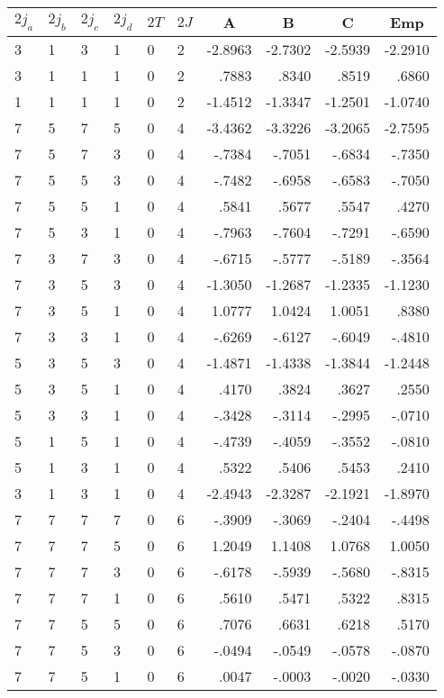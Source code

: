 \clearpage
\small
\begin{center}
\begin{tabular}{llllllrrrr}
\hline
$2j_{a}$&$2j_{b}$&$2j_{c}$&$2j_{d}$&$2T$&$2J$&
\multicolumn{1}{c}{A}&
\multicolumn{1}{c}{B}&
\multicolumn{1}{c}{C}&
\multicolumn{1}{c}{Emp}
\\\hline
  3& 1& 3& 1& 0& 2& -2.8963& -2.7302& -2.5939& -2.2910\\
  3& 1& 1& 1& 0& 2&   .7883&   .8340&   .8519&   .6860\\
  1& 1& 1& 1& 0& 2& -1.4512& -1.3347& -1.2501& -1.0740\\
  7& 5& 7& 5& 0& 4& -3.4362& -3.3226& -3.2065& -2.7595\\
  7& 5& 7& 3& 0& 4&  -.7384&  -.7051&  -.6834&  -.7350\\
  7& 5& 5& 3& 0& 4&  -.7482&  -.6958&  -.6583&  -.7050\\
  7& 5& 5& 1& 0& 4&   .5841&   .5677&   .5547&   .4270\\
  7& 5& 3& 1& 0& 4&  -.7963&  -.7604&  -.7291&  -.6590\\
  7& 3& 7& 3& 0& 4&  -.6715&  -.5777&  -.5189&  -.3564\\
  7& 3& 5& 3& 0& 4& -1.3050& -1.2687& -1.2335& -1.1230\\
  7& 3& 5& 1& 0& 4&  1.0777&  1.0424&  1.0051&   .8380\\
  7& 3& 3& 1& 0& 4&  -.6269&  -.6127&  -.6049&  -.4810\\
  5& 3& 5& 3& 0& 4& -1.4871& -1.4338& -1.3844& -1.2448\\
  5& 3& 5& 1& 0& 4&   .4170&   .3824&   .3627&   .2550\\
  5& 3& 3& 1& 0& 4&  -.3428&  -.3114&  -.2995&  -.0710\\
  5& 1& 5& 1& 0& 4&  -.4739&  -.4059&  -.3552&  -.0810\\
  5& 1& 3& 1& 0& 4&   .5322&   .5406&   .5453&   .2410\\
  3& 1& 3& 1& 0& 4& -2.4943& -2.3287& -2.1921& -1.8970\\
  7& 7& 7& 7& 0& 6&  -.3909&  -.3069&  -.2404&  -.4498\\
  7& 7& 7& 5& 0& 6&  1.2049&  1.1408&  1.0768&  1.0050\\
  7& 7& 7& 3& 0& 6&  -.6178&  -.5939&  -.5680&  -.8315\\
  7& 7& 7& 1& 0& 6&   .5610&   .5471&   .5322&   .8315\\
  7& 7& 5& 5& 0& 6&   .7076&   .6631&   .6218&   .5170\\
  7& 7& 5& 3& 0& 6&  -.0494&  -.0549&  -.0578&  -.0870\\
  7& 7& 5& 1& 0& 6&   .0047&  -.0003&  -.0020&  -.0330\\
\hline
\end{tabular}
\end{center}
